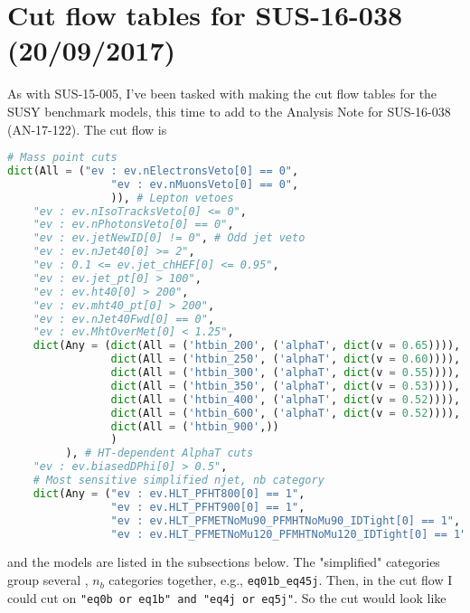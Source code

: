 
\chapter{Cut flow tables for SUS-16-038 (20/09/2017)}
\label{sec:cutflowtables2016paper}

As with SUS-15-005, I've been tasked with making the cut flow tables for the SUSY benchmark models, this time to add to the Analysis Note for SUS-16-038 (AN-17-122). The cut flow is

\begin{lstlisting}[belowskip=-0.7cm, language=python]
# Mass point cuts
dict(All = ("ev : ev.nElectronsVeto[0] == 0",
                "ev : ev.nMuonsVeto[0] == 0",
                )), # Lepton vetoes                                                                                                                        
    "ev : ev.nIsoTracksVeto[0] <= 0",
    "ev : ev.nPhotonsVeto[0] == 0",
    "ev : ev.jetNewID[0] != 0", # Odd jet veto 
    "ev : ev.nJet40[0] >= 2",
    "ev : 0.1 <= ev.jet_chHEF[0] <= 0.95",
    "ev : ev.jet_pt[0] > 100",
    "ev : ev.ht40[0] > 200",
    "ev : ev.mht40_pt[0] > 200",
    "ev : ev.nJet40Fwd[0] == 0",
    "ev : ev.MhtOverMet[0] < 1.25",
    dict(Any = (dict(All = ('htbin_200', ('alphaT', dict(v = 0.65)))),
                dict(All = ('htbin_250', ('alphaT', dict(v = 0.60)))),
                dict(All = ('htbin_300', ('alphaT', dict(v = 0.55)))),
                dict(All = ('htbin_350', ('alphaT', dict(v = 0.53)))),
                dict(All = ('htbin_400', ('alphaT', dict(v = 0.52)))),
                dict(All = ('htbin_600', ('alphaT', dict(v = 0.52)))),
                dict(All = ('htbin_900',))
                )
         ), # HT-dependent AlphaT cuts                                                                                                                     
    "ev : ev.biasedDPhi[0] > 0.5",
    # Most sensitive simplified njet, nb category
    dict(Any = ("ev : ev.HLT_PFHT800[0] == 1",
                "ev : ev.HLT_PFHT900[0] == 1",
                "ev : ev.HLT_PFMETNoMu90_PFMHTNoMu90_IDTight[0] == 1",
                "ev : ev.HLT_PFMETNoMu120_PFMHTNoMu120_IDTight[0] == 1")), # HLTs, needed only for LLP models
\end{lstlisting}

and the models are listed in the subsections below. The "simplified" categories group several \njet, $n_b$ categories together, e.g., \texttt{eq01b\_eq45j}. Then, in the cut flow I could cut on \texttt{"eq0b or eq1b" and "eq4j or eq5j"}. So the cut would look like

